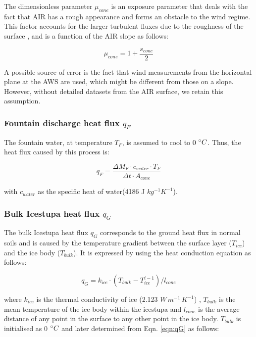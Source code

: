 \documentclass[utf8]{frontiersSCNS}
\begin{document}
The dimensionless parameter $\mu_{cone}$ is an exposure parameter that deals with the fact that AIR has a rough
appearance and forms an obstacle to the wind regime. This factor accounts for the larger turbulent fluxes due to
the roughness of the surface \citep{Oerlemans_2021}, and is a function of the AIR slope as follows:

\begin{equation}
	\mu_{cone} = 1 + \frac{s_{cone}}{2}
\end{equation}

A possible source of error is the fact that wind measurements from the horizontal plane at the AWS are used,
which might be different from those on a slope. However, without detailed datasets from the AIR surface, we
retain this assumption.

\subsubsection{Fountain discharge heat flux \texorpdfstring{$q_{F}$}{Lg} }

The fountain water, at temperature $T_F$, is assumed to cool to 0 $\degree C$. Thus, the heat flux caused by this
process is:

\begin{equation}
	q_{F} = \frac{ \Delta M_F \cdot c_{water} \cdot T_F}{\Delta t \cdot A_{cone}}
	\label{eqn:qF}
\end{equation}

with $c_{water}$ as the specific heat of water(4186 J $kg^{-1} K^{-1}$).

\subsubsection{Bulk Icestupa heat flux \texorpdfstring{$q_{G}$}{Lg}} \label{sec:Bulkflux}

The bulk Icestupa heat flux $q_{G}$ corresponds to the ground heat flux in normal soils and is caused by the
temperature gradient between the surface layer ($T_{ice}$) and the ice body ($T_{bulk}$). It is expressed by
using the heat conduction equation as follows:

\begin{equation} q_{G} = k_{ice} \cdot (T_{bulk}-T_{ice}^{i-1})/l_{cone} \label{eqn:qG}    \end{equation}

where $k_{ice}$ is the thermal conductivity of ice (2.123 $W\, m^{-1}\,K^{-1}$) , $T_{bulk}$ is the mean
temperature of the ice body within the icestupa and $l_{cone}$ is the average distance of any point in the
surface to any other point in the ice body. $T_{bulk}$ is initialised as 0 $\degree C$ and later determined from
Eqn. \ref{eqn:qG} as follows:
\end{document}
